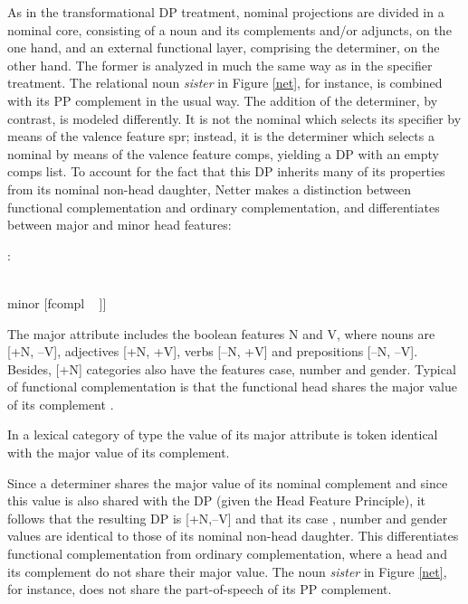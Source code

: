 \documentclass[output=paper]{langsci/langscibook}
\begin{document}
As in the transformational DP treatment, nominal projections are divided in a nominal core, 
consisting of a noun and its complements and/or adjuncts, on the one hand, and an external 
functional layer, comprising the determiner, on the other hand. The former is analyzed in much the 
same way as in the specifier treatment. The relational noun   
\emph{sister} in Figure \ref{net}, for instance, is combined with 
its PP complement in the usual way. The addition of the determiner, by contrast, is 
modeled differently. It is not the nominal which selects its specifier by means of the valence 
feature {\sc spr}; instead, it is the determiner which selects a nominal by means of 
the valence feature {\sc comps}, yielding a DP with an empty {\sc comps} list. 
To account for the fact that this DP inherits many of its properties from its nominal 
non-head daughter, Netter makes a distinction between functional 
complementation and ordinary complementation, and differentiates between major and minor 
{\sc head} features: 

\begin{exe} 
\ex  {}: \begin{avm}
                              [major [n ~ \type{boolean} \\
                                      v ~ \type{boolean} ] \\
                               minor [fcompl ~ ]]
                              \end{avm} 
\end{exe} 

\noindent
The {\sc major} attribute includes the boolean features N and V, where 
nouns are [+N, --V], adjectives [+N, +V], verbs [--N, +V] and prepositions [--N, --V]. 
Besides, [+N] categories also have the features {\sc case}, {\sc number} and {\sc gender}. 
Typical of functional complementation is that the functional head shares the 
{\sc major} value of its complement \citep[311--312]{Netter94}. 

\begin{exe} 
\ex\label{maj} In a lexical category of type  the value of its {\sc major} 
      attribute is token identical with the {\sc major} value of its complement. 
\end{exe} 

\noindent
Since a determiner shares the {\sc major} value of its nominal complement and since this value is 
also shared with the DP (given the Head Feature Principle), it follows that the resulting 
DP is [+N,--V] and that its {\sc case} , {\sc number} and {\sc gender} values are 
identical to those of its nominal non-head daughter. 
This differentiates functional complementation from ordinary complementation, where 
a head and its complement do not share their {\sc major} value. The noun \emph{sister} 
in Figure \ref{net}, for instance, does not share the part-of-speech of its PP complement. 
\end{document}
